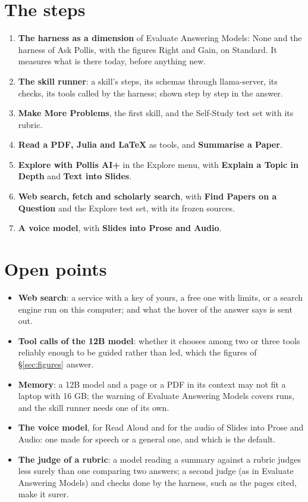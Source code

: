 \section{The steps}\label{sec:steps}
\begin{enumerate}[label=\arabic*.]
  \item \textbf{The harness as a dimension} of Evaluate Answering Models: None and the harness of Ask Pollis, with
    the figures Right and Gain, on Standard. It measures what is there today, before anything new.
  \item \textbf{The skill runner}: a skill's steps, its schemas through llama-server, its checks, its tools called
    by the harness; shown step by step in the answer.
  \item \textbf{Make More Problems}, the first skill, and the Self-Study test set with its rubric.
  \item \textbf{Read a PDF, Julia and LaTeX} as tools, and \textbf{Summarise a Paper}.
  \item \textbf{Explore with Pollis AI+} in the Explore menu, with \textbf{Explain a Topic in Depth} and
    \textbf{Text into Slides}.
  \item \textbf{Web search, fetch and scholarly search}, with \textbf{Find Papers on a Question} and the Explore
    test set, with its frozen sources.
  \item \textbf{A voice model}, with \textbf{Slides into Prose and Audio}.
\end{enumerate}

\section{Open points}\label{sec:open}
\begin{itemize}
  \item \textbf{Web search}: a service with a key of yours, a free one with limits, or a search engine run on this
    computer; and what the hover of the answer says is sent out.
  \item \textbf{Tool calls of the 12B model}: whether it chooses among two or three tools reliably enough to be
    guided rather than led, which the figures of \S\ref{sec:figures} answer.
  \item \textbf{Memory}: a 12B model and a page or a PDF in its context may not fit a laptop with 16 GB; the warning
    of Evaluate Answering Models covers runs, and the skill runner needs one of its own.
  \item \textbf{The voice model}, for Read Aloud and for the audio of Slides into Prose and Audio: one made for speech
    or a general one, and which is the default.
  \item \textbf{The judge of a rubric}: a model reading a summary against a rubric judges less surely than one
    comparing two answers; a second judge (as in Evaluate Answering Models) and checks done by the harness, such as the
    pages cited, make it surer.
\end{itemize}


